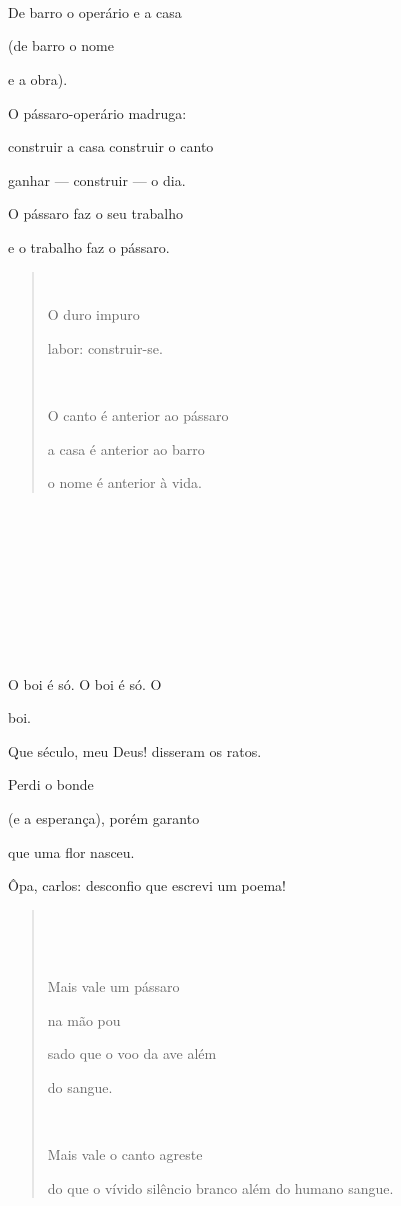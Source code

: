 





De barro o operário e a casa

(de barro o nome

e a obra).

O pássaro-operário madruga:

construir a casa construir o canto

ganhar --- construir --- o dia.

O pássaro faz o seu trabalho

e o trabalho faz o pássaro.

\begin{quote}


O duro impuro

labor: construir-se.



O canto é anterior ao pássaro

a casa é anterior ao barro

o nome é anterior à vida.
\end{quote}









 

O boi é só. O boi é só. O

boi.

Que século, meu Deus! disseram os ratos.

Perdi o bonde

(e a esperança), porém garanto

que uma flor nasceu.

Ôpa, carlos: desconfio que escrevi um poema!

\begin{quote}




Mais vale um pássaro

na mão pou

sado que o voo da ave além

do sangue.



Mais vale o canto agreste

do que o vívido silêncio branco além do humano sangue.
\end{quote}






